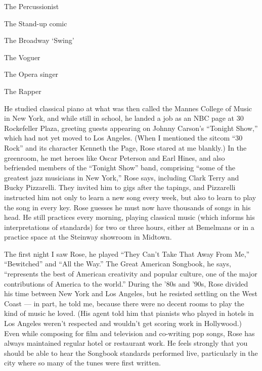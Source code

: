 The Percussionist

\href{https://www.nytimes3xbfgragh.onion/interactive/2019/05/30/magazine/female-comedy-new-york.html}{}

The Stand-up comic

\href{https://www.nytimes3xbfgragh.onion/interactive/2019/05/30/magazine/aladdin-musical-new-york.html}{}

The Broadway `Swing'

\href{https://www.nytimes3xbfgragh.onion/interactive/2019/05/30/magazine/vogue-kiki-new-york.html}{}

The Voguer

\href{https://www.nytimes3xbfgragh.onion/interactive/2019/05/30/magazine/metropolitan-opera-singer-new-york.html}{}

The Opera singer

\href{https://www.nytimes3xbfgragh.onion/interactive/2019/05/30/magazine/princess-nokia-new-york.html}{}

The Rapper

He studied classical piano at what was then called the Mannes College of
Music in New York, and while still in school, he landed a job as an NBC
page at 30 Rockefeller Plaza, greeting guests appearing on Johnny
Carson's ``Tonight Show,'' which had not yet moved to Los Angeles. (When
I mentioned the sitcom ``30 Rock'' and its character Kenneth the Page,
Rose stared at me blankly.) In the greenroom, he met heroes like Oscar
Peterson and Earl Hines, and also befriended members of the ``Tonight
Show'' band, comprising ``some of the greatest jazz musicians in New
York,'' Rose says, including Clark Terry and Bucky Pizzarelli. They
invited him to gigs after the tapings, and Pizzarelli instructed him not
only to learn a new song every week, but also to learn to play the song
in every key. Rose guesses he must now have thousands of songs in his
head. He still practices every morning, playing classical music (which
informs his interpretations of standards) for two or three hours, either
at Bemelmans or in a practice space at the Steinway showroom in Midtown.

The first night I saw Rose, he played ``They Can't Take That Away From
Me,'' ``Bewitched'' and ``All the Way.'' The Great American Songbook, he
says, ``represents the best of American creativity and popular culture,
one of the major contributions of America to the world.'' During the
'80s and '90s, Rose divided his time between New York and Los Angeles,
but he resisted settling on the West Coast --- in part, he told me,
because there were no decent rooms to play the kind of music he loved.
(His agent told him that pianists who played in hotels in Los Angeles
weren't respected and wouldn't get scoring work in Hollywood.) Even
while composing for film and television and co-writing pop songs, Rose
has always maintained regular hotel or restaurant work. He feels
strongly that you should be able to hear the Songbook standards
performed live, particularly in the city where so many of the tunes were
first written.


